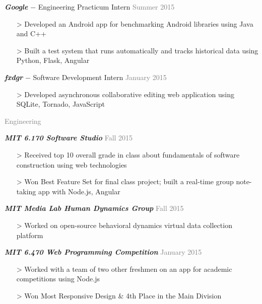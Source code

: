 \documentclass[11pt]{article}
\newcommand{\rsection}[1]{\vspace{1.5em}\textcolor{gray}{\Large \robotoslab #1}\vspace{0.5em}}
\newcommand{\bt}[1]{\textit{\textbf{#1}}} %
\newcommand{\gap}[0]{\vspace{0.5em}} %
\newcommand{\dash}[0]{ $-$ } %
\newcommand{\gray}[1]{\textcolor{gray}{#1}}
\newcommand{\e}[0]{> }
\begin{document}
\gap

\bt{Google}\dash Engineering Practicum Intern \hfill \gray{Summer 2015}

\begin{itemize}
\item[\e] Developed an Android app for benchmarking Android libraries using Java and C++
\item[\e] Built a test system that runs automatically and tracks historical data using Python, Flask, Angular
\end{itemize}

\gap

\bt{fxdgr}\dash Software Development Intern \hfill \gray{January 2015}

\begin{itemize}
\item[\e] Developed asynchronous collaborative editing web application using SQLite, Tornado, JavaScript
\end{itemize}

\rsection{Engineering}

\bt{MIT 6.170 Software Studio} \hfill \gray{Fall 2015}

\begin{itemize}
\item[\e] Received top 10 overall grade in class about fundamentals of software construction using web technologies
\item[\e] Won Best Feature Set for final class project; built a real-time group note-taking app with Node.js, Angular
\end{itemize}

\gap

\bt{MIT Media Lab Human Dynamics Group} \hfill \gray{Fall 2015}

\begin{itemize}
\item[\e] Worked on open-source behavioral dynamics virtual data collection platform
\end{itemize}

\gap

\bt{MIT 6.470 Web Programming Competition} \hfill \gray{January 2015}

\begin{itemize}
\item[\e] Worked with a team of two other freshmen on an app for academic competitions using Node.js
\item[\e] Won Most Responsive Design \& 4th Place in the Main Division
\end{itemize}
\end{document}
